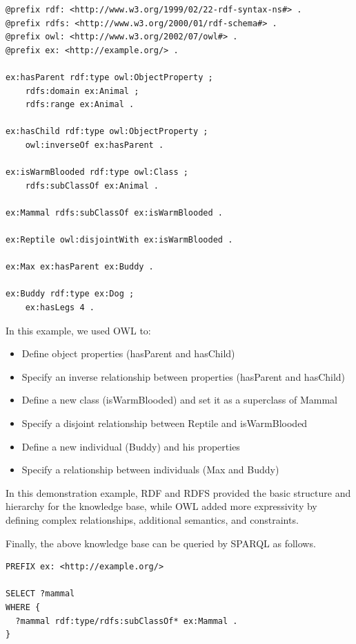 \begin{mdframed}
\begin{lstlisting}
@prefix rdf: <http://www.w3.org/1999/02/22-rdf-syntax-ns#> .
@prefix rdfs: <http://www.w3.org/2000/01/rdf-schema#> .
@prefix owl: <http://www.w3.org/2002/07/owl#> .
@prefix ex: <http://example.org/> .

ex:hasParent rdf:type owl:ObjectProperty ;
    rdfs:domain ex:Animal ;
    rdfs:range ex:Animal .

ex:hasChild rdf:type owl:ObjectProperty ;
    owl:inverseOf ex:hasParent .

ex:isWarmBlooded rdf:type owl:Class ;
    rdfs:subClassOf ex:Animal .

ex:Mammal rdfs:subClassOf ex:isWarmBlooded .

ex:Reptile owl:disjointWith ex:isWarmBlooded .

ex:Max ex:hasParent ex:Buddy .

ex:Buddy rdf:type ex:Dog ;
    ex:hasLegs 4 .
\end{lstlisting}

In this example, we used OWL to:
\begin{itemize}
  \item Define object properties (hasParent and hasChild)
  \item Specify an inverse relationship between properties (hasParent and hasChild)
  \item Define a new class (isWarmBlooded) and set it as a superclass of Mammal
  \item Specify a disjoint relationship between Reptile and isWarmBlooded
  \item Define a new individual (Buddy) and his properties
  \item Specify a relationship between individuals (Max and Buddy)
\end{itemize}

In this demonstration example, RDF and RDFS provided the basic structure and hierarchy for the knowledge base, while OWL added more expressivity by defining complex relationships, additional semantics, and constraints.

Finally, the above knowledge base can be queried by SPARQL as follows.

\begin{lstlisting}
PREFIX ex: <http://example.org/>

SELECT ?mammal
WHERE {
  ?mammal rdf:type/rdfs:subClassOf* ex:Mammal .
}
\end{lstlisting}

\end{mdframed}

